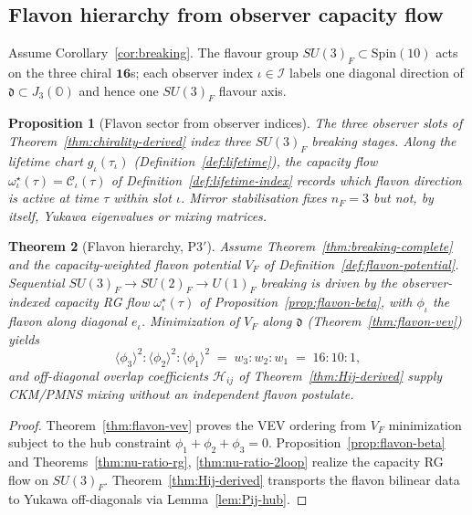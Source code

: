 \documentclass[11pt]{article}
\theoremstyle{plain}
\newtheorem{theorem}{Theorem}[section]
\newtheorem{proposition}[theorem]{Proposition}
\theoremstyle{definition}
\theoremstyle{remark}
\numberwithin{equation}{section}
\newcommand{\jalg}{J_3(\mathbb{O})}
\newcommand{\Spin}{\mathrm{Spin}}
\newcommand{\capacity}{\mathcal{C}}
\begin{document}
\subsection{Flavon hierarchy from observer capacity flow}
\label{sec:physics:flavon}

Assume Corollary~\ref{cor:breaking}. The flavour group
$SU(3)_F\subset\Spin(10)$ acts on the three chiral $\mathbf{16}$s; each
observer index $\iota\in\mathcal{I}$ labels one diagonal direction of
$\mathfrak{d}\subset\jalg$ and hence one $SU(3)_F$ flavour axis.

\begin{proposition}[Flavon sector from observer indices]\label{prop:flavon-sector}
The three observer slots of Theorem~\ref{thm:chirality-derived} index three
$SU(3)_F$ breaking stages. Along the lifetime chart $g_\iota(\tau_\iota)$
(Definition~\ref{def:lifetime}), the capacity flow
$\omega^\star_\iota(\tau)=\capacity_\iota(\tau)$ of
Definition~\ref{def:lifetime-index} records which flavon direction is active at
time $\tau$ within slot $\iota$. Mirror stabilisation fixes $n_F=3$ but not,
by itself, Yukawa eigenvalues or mixing matrices.
\end{proposition}

\begin{theorem}[Flavon hierarchy, P3$'$]\label{thm:flavon-hierarchy}
Assume Theorem~\ref{thm:breaking-complete} and the capacity-weighted flavon
potential $V_F$ of Definition~\ref{def:flavon-potential}. Sequential
$SU(3)_F\to SU(2)_F\to U(1)_F$ breaking is driven by the observer-indexed
capacity RG flow $\omega^\star_\iota(\tau)$ of
Proposition~\ref{prop:flavon-beta}, with $\phi_\iota$ the flavon along
diagonal $e_\iota$. Minimization of $V_F$ along $\mathfrak{d}$
(Theorem~\ref{thm:flavon-vev}) yields
\begin{equation}\label{eq:flavon-hierarchy-vev}
  \langle\phi_3\rangle^2 : \langle\phi_2\rangle^2 : \langle\phi_1\rangle^2
  \;=\;
  w_3 : w_2 : w_1
  \;=\;
  16 : 10 : 1,
\end{equation}
and off-diagonal overlap coefficients $\mathcal{H}_{ij}$ of
Theorem~\ref{thm:Hij-derived} supply CKM/PMNS mixing without an independent
flavon postulate.
\end{theorem}

\begin{proof}
Theorem~\ref{thm:flavon-vev} proves the VEV ordering from $V_F$ minimization
subject to the hub constraint $\phi_1+\phi_2+\phi_3=0$.
Proposition~\ref{prop:flavon-beta} and Theorems~\ref{thm:nu-ratio-rg},
\ref{thm:nu-ratio-2loop} realize the capacity RG flow on $SU(3)_F$.
Theorem~\ref{thm:Hij-derived} transports the flavon bilinear data to Yukawa
off-diagonals via Lemma~\ref{lem:Pij-hub}.
\end{proof}%
\end{document}
